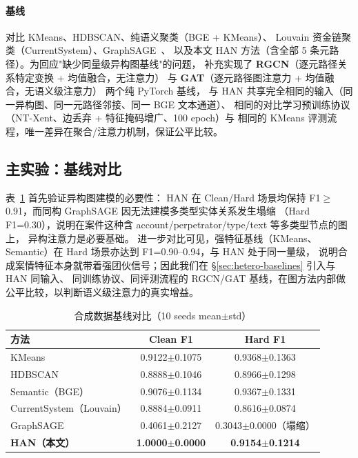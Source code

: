 \documentclass[12pt,a4paper,fontset=windows]{ctexart}
\begin{document}
\paragraph{基线} 对比 KMeans、HDBSCAN、纯语义聚类（BGE + KMeans）、
Louvain 资金链聚类（CurrentSystem）、GraphSAGE~\cite{hamilton2017graphsage}、
以及本文 HAN 方法（含全部 5 条元路径）。为回应"缺少同量级异构图基线"的问题，
补充实现了 \textbf{RGCN}（逐元路径关系特定变换 + 均值融合，无注意力）\cite{schlichtkrull2018rgcn} 与
\textbf{GAT}（逐元路径图注意力 + 均值融合，无语义级注意力）\cite{velickovic2018gat} 两个纯 PyTorch 基线，
与 HAN 共享完全相同的输入（同一异构图、同一元路径邻接、同一 BGE 文本通道）、
相同的对比学习预训练协议（NT-Xent、边丢弃 + 特征掩码增广、100 epoch）与
相同的 KMeans 评测流程，唯一差异在聚合/注意力机制，保证公平比较。

\subsection{主实验：基线对比}

表~\ref{tab:baselines} 首先验证异构图建模的必要性：
HAN 在 Clean/Hard 场景均保持 F1$\ge$0.91，而同构 GraphSAGE 因无法建模多类型实体关系发生塌缩
（Hard F1=0.30），说明在案件这种含 account/perpetrator/type/text 等多类型节点的图上，
异构注意力是必要基础。
进一步对比可见，强特征基线（KMeans、Semantic）在 Hard 场景亦达到 F1=0.90--0.94，与 HAN 处于同一量级，
说明合成案情特征本身就带着强团伙信号；因此我们在 \S\ref{sec:hetero-baselines} 引入与 HAN 同输入、
同训练协议、同评测流程的 RGCN/GAT 基线，在图方法内部做公平比较，以判断语义级注意力的真实增益。

\begin{table}[htbp]
  \centering
  \caption{合成数据基线对比（10 seeds mean$\pm$std）}
  \label{tab:baselines}
  \begin{tabular}{lcc}
    \toprule
    方法 & Clean F1 & Hard F1 \\
    \midrule
    KMeans & 0.9122$\pm$0.1075 & 0.9368$\pm$0.1363 \\
    HDBSCAN & 0.8888$\pm$0.1046 & 0.8966$\pm$0.1298 \\
    Semantic（BGE） & 0.9076$\pm$0.1134 & 0.9367$\pm$0.1331 \\
    CurrentSystem（Louvain） & 0.8884$\pm$0.0911 & 0.8616$\pm$0.0874 \\
    GraphSAGE & 0.4061$\pm$0.2127 & 0.3043$\pm$0.0000（塌缩） \\
    \textbf{HAN（本文）} & \textbf{1.0000$\pm$0.0000} & \textbf{0.9154$\pm$0.1214} \\
    \bottomrule
  \end{tabular}
\end{table}
\end{document}
